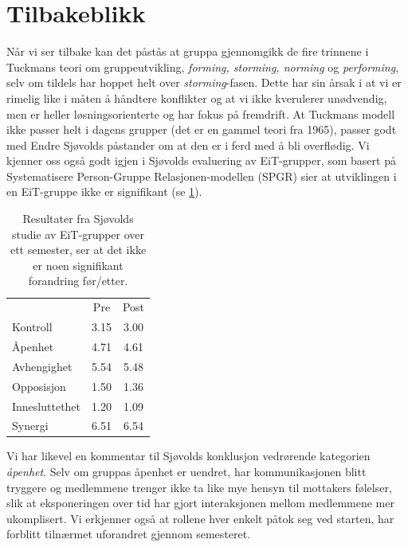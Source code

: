 \section{Tilbakeblikk}
\label{sec:tilbakeblikk}

Når vi ser tilbake kan det påstås at gruppa gjennomgikk de fire trinnene i
Tuckmans \cite{tuckman} teori om gruppeutvikling, \emph{forming, storming,
norming} og \emph{performing}, selv om tildels har hoppet helt over
\emph{storming}-fasen. Dette har sin årsak i at vi er rimelig like i måten å
håndtere konflikter og at vi ikke kverulerer unødvendig, men er heller
løsningsorienterte og har fokus på fremdrift. At Tuckmans modell ikke passer
helt i dagens grupper (det er en gammel teori fra 1965), passer godt med Endre
Sjøvolds \cite{sjovold} påstander om at den er i ferd med å bli overflødig. Vi
kjenner oss også godt igjen i Sjøvolds evaluering av EiT-grupper, som basert på
Systematisere Person-Gruppe Relasjonen-modellen (SPGR) sier at utviklingen i en
EiT-gruppe ikke er signifikant (se \cref{tab:sjovold}).

\begin{table}[ht!]
\centering
\begin{tabular}{l c c}
& Pre & Post  \\
Kontroll & 3.15 & 3.00 \\
Åpenhet & 4.71 & 4.61 \\
Avhengighet & 5.54 & 5.48 \\
Opposisjon & 1.50 & 1.36 \\
Innesluttethet & 1.20 & 1.09 \\
Synergi & 6.51 & 6.54 \\
\end{tabular}
\caption{Resultater fra Sjøvolds studie av EiT-grupper over ett semester, ser at
det ikke er noen signifikant forandring før/etter.}
\label{tab:sjovold}
\end{table}

Vi har likevel en kommentar til Sjøvolds konklusjon vedrørende kategorien
\emph{åpenhet}. Selv om gruppas åpenhet er uendret, har kommunikasjonen blitt
tryggere og medlemmene trenger ikke ta like mye hensyn til mottakers følelser, 
slik at eksponeringen over tid har gjort interaksjonen mellom
medlemmene mer ukomplisert. Vi erkjenner også at rollene hver enkelt påtok
seg ved starten, har forblitt tilnærmet uforandret gjennom semesteret.
